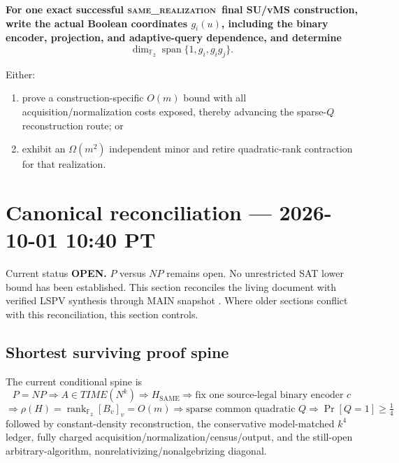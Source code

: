 \documentclass[11pt]{article}
\newcommand{\statusopen}{\textcolor{openstatus}{\textbf{OPEN}}}
\newcommand{\same}{\textsc{same\_realization}}
\newcommand{\Ftwo}{\mathbb{F}_2}
\begin{document}
\begin{candidatebox}
\textbf{For one exact successful \same\ final SU/vMS construction, write the actual Boolean
coordinates \(g_i(u)\), including the binary encoder, projection, and adaptive-query dependence, and
determine}
\[
\boxed{
\dim_{\Ftwo}\operatorname{span}\{1,g_i,g_i g_j\}.
}
\]

Either:
\begin{enumerate}
  \item prove a construction-specific \(O(m)\) bound with all acquisition/normalization costs exposed,
        thereby advancing the sparse-\(Q\) reconstruction route; or
  \item exhibit an \(\Omega(m^2)\) independent minor and retire quadratic-rank contraction for that
        realization.
\end{enumerate}
\end{candidatebox}


\section{Canonical reconciliation --- 2026-10-01 10:40 PT}
\label{sec:canonical-reconciliation-20261001}

\begin{statusbox}{Current status}
\textbf{\statusopen.} \(P\) versus \(NP\) remains open.  No unrestricted SAT lower bound
has been established.  This section reconciles the living document with verified
LSPV synthesis through MAIN snapshot
.
Where older sections conflict with this reconciliation, this section controls.
\end{statusbox}

\subsection{Shortest surviving proof spine}

The current conditional spine is
\[
 P=NP
 \Longrightarrow A\in TIME(N^k)
 \Longrightarrow H_{\mathrm{SAME}}
 \Longrightarrow
 \boxed{\text{fix one source-legal binary encoder }c}
\]
\[
 \Longrightarrow
 \boxed{\rho(H)=\operatorname{rank}_{\mathbb F_2}[B_v]_v=O(m)}
 \Longrightarrow
 \text{sparse common quadratic }Q
 \Longrightarrow
 \Pr[Q=1]\ge \tfrac14
\]
followed by constant-density reconstruction, the conservative model-matched
\(k^4\) ledger, fully charged acquisition/normalization/census/output, and the
still-open arbitrary-algorithm, nonrelativizing/nonalgebrizing diagonal.
\end{document}
